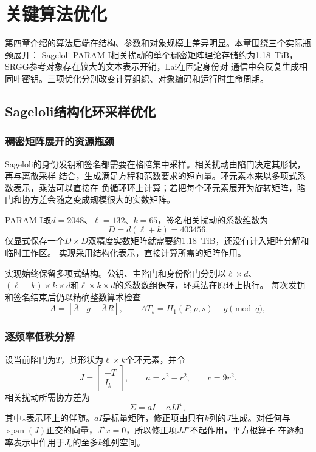 \chapter{关键算法优化}

第四章介绍的算法后端在结构、参数和对象规模上差异明显。本章围绕三个实际瓶颈展开：
Sageloli PARAM-I相关扰动的单个稠密矩阵理论存储约为1.18~TiB，SRGG参考对象存在较大的文本表示开销，Lai在固定身份对
通信中会反复生成相同叶密钥。三项优化分别改变计算组织、对象编码和运行时生命周期。

\section{Sageloli结构化环采样优化}

\subsection{稠密矩阵展开的资源瓶颈}

Sageloli的身份发钥和签名都需要在格陪集中采样。相关扰动由陷门决定其形状，再与离散采样
结合，生成满足方程和范数要求的短向量。环元素本来以多项式系数表示，乘法可以直接在
负循环环上计算；若把每个环元素展开为旋转矩阵，陷门和协方差会随之变成规模很大的实数矩阵。

PARAM-I取$d=2048$、$\ell=132$、$k=65$，签名相关扰动的系数维数为
\[
 D=d(\ell+k)=403456.
\]
仅显式保存一个$D\times D$双精度实数矩阵就需要约1.18~TiB，还没有计入矩阵分解和临时工作区。
实现采用结构化表示，直接计算所需的矩阵作用。

实现始终保留多项式结构。公钥、主陷门和身份陷门分别以$\ell\times d$、
$(\ell-k)\times k\times d$和$\ell\times k\times d$的系数数组保存，环乘法在原环上执行。
每次发钥和签名结束后仍以精确整数算术检查
\[
 A=[\bar A\mid g-\bar AR],\qquad
 AT_s=H_1(P,\rho,s)-g\pmod q,
\]


\subsection{逐频率低秩分解}

设当前陷门为$T$，其形状为$\ell\times k$个环元素，并令
\[
 J=\begin{bmatrix}-T\\I_k\end{bmatrix},\qquad
 a=s^2-r^2,\qquad c=9r^2.
\]
相关扰动所需协方差为
\[
 \Sigma=aI-cJJ^\star,
\]
其中$\star$表示环上的伴随。$aI$是标量矩阵，修正项由只有$k$列的$J$生成。对任何与
$\operatorname{span}(J)$正交的向量，$J^\star x=0$，所以修正项$JJ^\star$不起作用，平方根算子
在逐频率表示中作用于$J_\nu$的至多$k$维列空间。

